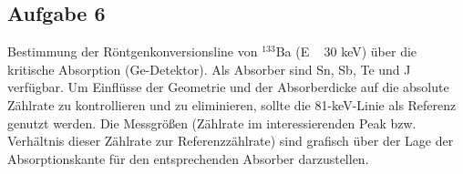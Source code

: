 \subsection{Aufgabe 6}
Bestimmung der Röntgenkonversionsline von $^{133}$Ba (E ~ 30 keV) über die kritische Absorption (Ge-Detektor). Als Absorber sind Sn, Sb, Te und J verfügbar. Um Einflüsse der Geometrie und der Absorberdicke auf die absolute Zählrate zu kontrollieren und zu eliminieren, sollte die 81-keV-Linie als Referenz genutzt werden. Die Messgrößen (Zählrate im interessierenden Peak bzw. Verhältnis dieser Zählrate zur Referenzzählrate) sind grafisch über der Lage der Absorptionskante für den entsprechenden Absorber darzustellen.